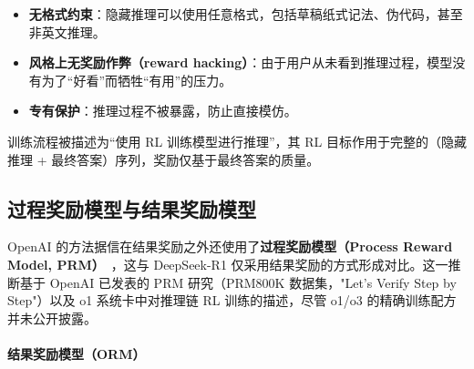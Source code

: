 \begin{itemize}
  \item \textbf{无格式约束}：隐藏推理可以使用任意格式，包括草稿纸式记法、伪代码，甚至非英文推理。
  \item \textbf{风格上无奖励作弊（reward hacking）}：由于用户从未看到推理过程，模型没有为了“好看”而牺牲“有用”的压力。
  \item \textbf{专有保护}：推理过程不被暴露，防止直接模仿。
\end{itemize}

训练流程被描述为“使用 RL 训练模型进行推理”，其 RL 目标作用于完整的（隐藏推理 + 最终答案）序列，奖励仅基于最终答案的质量。

\subsection{过程奖励模型与结果奖励模型}
\label{process-reward-models-vs.-outcome-reward-models}

OpenAI 的方法据信在结果奖励之外还使用了\textbf{过程奖励模型（Process Reward Model, PRM）}~\cite{lightman2023lets}，这与 DeepSeek-R1 仅采用结果奖励的方式形成对比。这一推断基于 OpenAI 已发表的 PRM 研究（PRM800K 数据集，"Let's Verify Step by Step"）以及 o1 系统卡中对推理链 RL 训练的描述，尽管 o1/o3 的精确训练配方并未公开披露。

\paragraph{结果奖励模型（ORM）}
\label{outcome-reward-model-orm}

